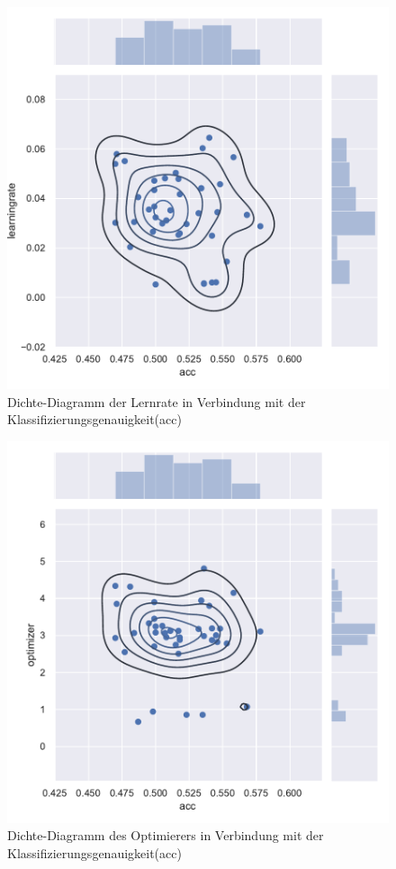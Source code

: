 \begin{figure}[H]
  \centering  
  \includegraphics[scale=0.5]{anhang/GA_250_cifar10_True_big_jointplot_learningrate.pdf}
  \caption{Dichte-Diagramm der Lernrate in Verbindung mit der Klassifizierungsgenauigkeit(acc)}
  
\end{figure}

\begin{figure}[H]
  \centering  
  \includegraphics[scale=0.5]{anhang/GA_250_cifar10_True_big_jointplot_optimizer.pdf}
  \caption{Dichte-Diagramm des Optimierers in Verbindung mit der Klassifizierungsgenauigkeit(acc)}
  
\end{figure}